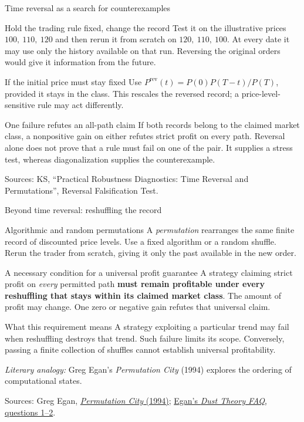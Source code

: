 \documentclass{beamer}
\newcommand{\sourcefoot}[1]{%
  \par\vfill{\fontsize{6.3}{7.5}\selectfont\color{black!65}Sources: #1\par}}
\begin{document}
\begin{frame}{Time reversal as a search for counterexamples}
\small
\begin{block}{Hold the trading rule fixed, change the record}
Test it on the illustrative prices $100,\ 110,\ 120$ and then rerun it
from scratch on $120,\ 110,\ 100$.
At every date it may use only the history available on that run.
Reversing the original orders would give it information from the future.
\end{block}
\begin{block}{If the initial price must stay fixed}
Use $P^{\mathrm{rev}}(t)=P(0)P(T-t)/P(T)$, provided it stays in the class.
This rescales the reversed record; a price-level-sensitive rule may act
differently.
\end{block}
\begin{alertblock}{One failure refutes an all-path claim}
If both records belong to the claimed market class, a nonpositive gain on
either refutes strict profit on every path.
Reversal alone does not prove that a rule must fail on one of the pair.
It supplies a stress test, whereas diagonalization supplies the counterexample.
\end{alertblock}
\sourcefoot{KS, \enquote{Practical Robustness Diagnostics: Time Reversal and Permutations},
Reversal Falsification Test.}
\end{frame}

\begin{frame}[shrink=8]{Beyond time reversal: reshuffling the record}
\small
\begin{block}{Algorithmic and random permutations}
A \emph{permutation} rearranges the same finite record of discounted price
levels. Use a fixed algorithm or a random shuffle. Rerun the trader from
scratch, giving it only the past available in the new order.
\end{block}
\begin{alertblock}{A necessary condition for a universal profit guarantee}
A strategy claiming strict profit on \emph{every} permitted path
\textbf{must remain profitable under every reshuffling that stays within
its claimed market class}. The amount of profit may change.
One zero or negative gain refutes that universal claim.
\end{alertblock}
\begin{exampleblock}{What this requirement means}
A strategy exploiting a particular trend may fail when reshuffling destroys
that trend. Such failure limits its scope. Conversely, passing a finite
collection of shuffles cannot establish universal profitability.
\end{exampleblock}
\medskip
\emph{Literary analogy:} Greg Egan's \emph{Permutation City} (1994)
explores the ordering of computational states.
\sourcefoot{Greg Egan, \href{https://www.gregegan.net/PERMUTATION/Permutation.html}{\emph{Permutation City} (1994)};
\href{https://www.gregegan.net/PERMUTATION/FAQ/FAQ.html}{Egan's \emph{Dust Theory FAQ}, questions 1--2}.}
\end{frame}
\end{document}
